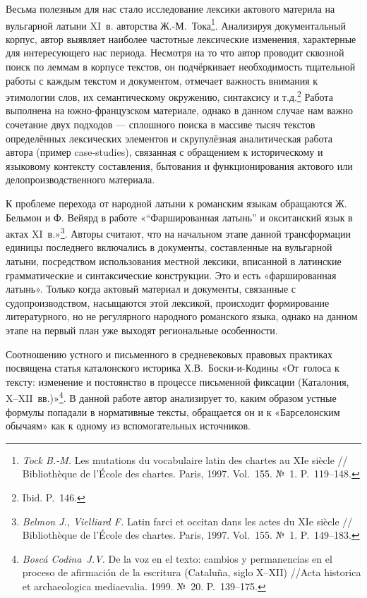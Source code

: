 Весьма полезным для нас стало исследование лексики актового материла на вульгарной латыни XI~в. авторства Ж.-М.~Тока\footnote{\emph{Tock B.-M.} Les mutations du vocabulaire latin des chartes au XIe siècle // Bibliothèque de l’École des chartes. Paris, 1997. Vol.~155. №~1. P.~119--148.}. Анализируя документальный корпус, автор выявляет наиболее частотные лексические изменения, характерные для интересующего нас периода. Несмотря на то что автор проводит сквозной поиск по леммам в корпусе текстов, он подчёркивает необходимость тщательной работы с каждым текстом и документом, отмечает важность внимания к этимологии слов, их семантическому окружению, синтаксису и т.д.\footnote{Ibid. P.~146.} Работа выполнена на южно-французском материале, однако в данном случае нам важно сочетание двух подходов --- сплошного поиска в массиве тысяч текстов определённых лексических элементов и скрупулёзная аналитическая работа автора (пример case-studies), связанная с обращением к историческому и языковому контексту составления, бытования и функционирования актового или делопроизводственного материала.

К проблеме перехода от народной латыни к романским языкам обращаются Ж. Бельмон и Ф. Вейярд в работе «“Фаршированная латынь” и окситанский язык в актах XI~в.»\footnote{\emph{Belmon J., Vielliard F.} Latin farci et occitan dans les actes du XIe siècle // Bibliothèque de l’École des chartes. Paris, 1997. Vol.~155. №~1. P.~149--183.}. Авторы считают, что на начальном этапе данной трансформации единицы последнего включались в документы, составленные на вульгарной латыни, посредством использования местной лексики, вписанной в латинские грамматические и синтаксические конструкции. Это и есть «фаршированная латынь». Только когда актовый материал и документы, связанные с судопроизводством, насыщаются этой лексикой, происходит формирование литературного, но не регулярного народного романского языка, однако на данном этапе на первый план уже выходят региональные особенности.

Соотношению устного и письменного в средневековых правовых практиках посвящена статья каталонского историка Х.В.~Боски-и-Кодины «От~голоса к тексту: изменение и постоянство в процессе письменной фиксации (Каталония, X--XII~вв.)»\footnote{\emph{Boscá Codina~J.V.} De la voz en el texto: cambios y permanencias en el proceso de afirmación de la escritura (Cataluña, siglo X--XII) //Acta historica et archaeologica mediaevalia. 1999. №~20. P.~139--175.}. В данной работе автор анализирует то, каким образом устные формулы попадали в нормативные тексты, обращается он и к «Барселонским обычаям» как к одному из вспомогательных источников.

